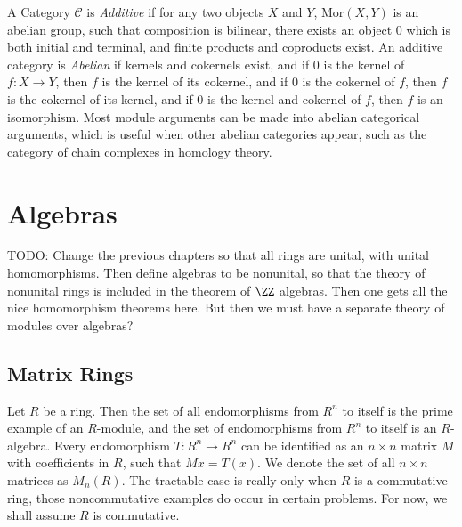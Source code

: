 A Category $\mathcal{C}$ is \emph{Additive} if for any two objects $X$ and $Y$, $\text{Mor}(X,Y)$ is an abelian group, such that composition is bilinear, there exists an object $0$ which is both initial and terminal, and finite products and coproducts exist. An additive category is \emph{Abelian} if kernels and cokernels exist, and if $0$ is the kernel of $f: X \to Y$, then $f$ is the kernel of its cokernel, and if $0$ is the cokernel of $f$, then $f$ is the cokernel of its kernel, and if $0$ is the kernel and cokernel of $f$, then $f$ is an isomorphism. Most module arguments can be made into abelian categorical arguments, which is useful when other abelian categories appear, such as the category of chain complexes in homology theory.

\chapter{Algebras}

TODO: Change the previous chapters so that all rings are unital, with unital homomorphisms. Then define algebras to be nonunital, so that the theory of nonunital rings is included in the theorem of $\ZZ$ algebras. Then one gets all the nice homomorphism theorems here. But then we must have a separate theory of modules over algebras?

\section{Matrix Rings}

Let $R$ be a ring. Then the set of all endomorphisms from $R^n$ to itself is the prime example of an $R$-module, and the set of endomorphisms from $R^n$ to itself is an $R$-algebra. Every endomorphism $T:R^n \to R^n$ can be identified as an $n \times n$ matrix $M$ with coefficients in $R$, such that $Mx = T(x)$. We denote the set of all $n \times n$ matrices as $M_n(R)$. The tractable case is really only when $R$ is a commutative ring, those noncommutative examples do occur in certain problems. For now, we shall assume $R$ is commutative.

